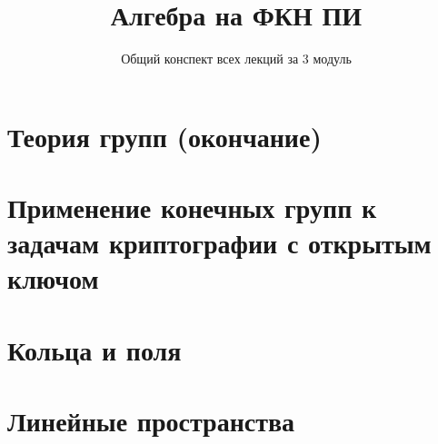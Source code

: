 \documentclass[a4paper,11pt]{article}
\title{Алгебра на ФКН ПИ}
\author{Общий конспект всех лекций за 3 модуль}
\begin{document}
    \maketitle

    \section{Теория групп (окончание)}
    
    

    \section{Применение конечных групп к задачам криптографии с открытым ключом}

    

    \section{Кольца и поля}

    

    \section{Линейные пространства}

    
\end{document}
